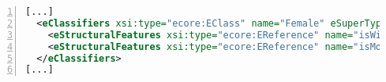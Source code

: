 \begin{lstlisting}[caption=Klasse Female als Ecore in XML, label=lst:ecore-modell, language=xml, basicstyle=\small, tabsize=4,frame=single, showstringspaces=false, numbers=left, keywordstyle=\bfseries, breaklines=true]
[...]
  <eClassifiers xsi:type="ecore:EClass" name="Female" eSuperTypes="#//Person">
    <eStructuralFeatures xsi:type="ecore:EReference" name="isWife" eType="#//Male"/>
    <eStructuralFeatures xsi:type="ecore:EReference" name="isMother" upperBound="-1" eType="#//Person"/>
  </eClassifiers>
[...]
\end{lstlisting}